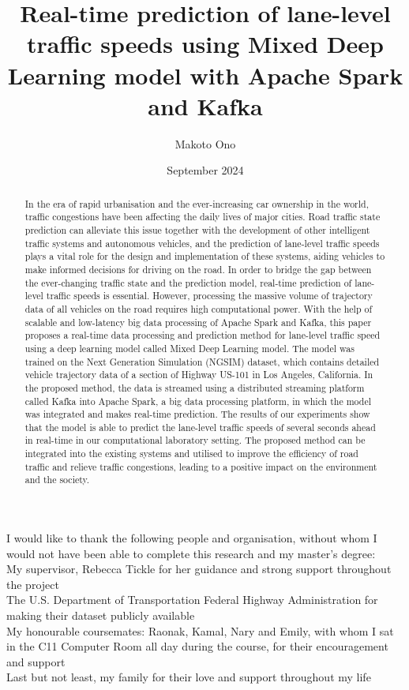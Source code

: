 \documentclass[11pt]{uonthesis}
\title{Real-time prediction of lane-level traffic speeds using Mixed Deep Learning model with Apache Spark and Kafka}
\author{Makoto Ono}
\date{September 2024}
\begin{document}
\begin{frontmatter}
\maketitle
\tableofcontents

\begin{abstract}
In the era of rapid urbanisation and the ever-increasing car ownership in the world, traffic congestions have been affecting the daily lives of major cities. Road traffic state prediction can alleviate this issue together with the development of other intelligent traffic systems and autonomous vehicles, and the prediction of lane-level traffic speeds plays a vital role for the design and implementation of these systems, aiding vehicles to make informed decisions for driving on the road. In order to bridge the gap between the ever-changing traffic state and the prediction model, real-time prediction of lane-level traffic speeds is essential. However, processing the massive volume of trajectory data of all vehicles on the road requires high computational power. With the help of scalable and low-latency big data processing of Apache Spark and Kafka, this paper proposes a real-time data processing and prediction method for lane-level traffic speed using a deep learning model called Mixed Deep Learning model. The model was trained on the Next Generation Simulation (NGSIM) dataset, which contains detailed vehicle trajectory data of a section of Highway US-101 in Los Angeles, California. In the proposed method, the data is streamed using a distributed streaming platform called Kafka into Apache Spark, a big data processing platform, in which the model was integrated and makes real-time prediction. The results of our experiments show that the model is able to predict the lane-level traffic speeds of several seconds ahead in real-time in our computational laboratory setting. The proposed method can be integrated into the existing systems and utilised to improve the efficiency of road traffic and relieve traffic congestions, leading to a positive impact on the environment and the society.
\end{abstract}

\begin{acknowledgements}
I would like to thank the following people and organisation, without whom I would not have been able to complete this research and my master's degree:\\ 
\noindent My supervisor, Rebecca Tickle for her guidance and strong support throughout the project\\
\noindent The U.S. Department of Transportation Federal Highway Administration for making their dataset publicly available\\
\noindent My honourable coursemates: Raonak, Kamal, Nary and Emily, with whom I sat in the C11 Computer Room all day during the course, for their encouragement and support\\
\noindent Last but not least, my family for their love and support throughout my life

\end{acknowledgements}

\end{frontmatter}
\end{document}

